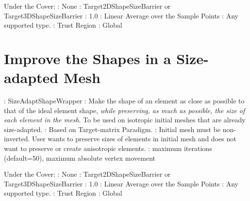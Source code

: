 \noindent Under the Cover: \newline
{}: None \newline
{}:  Target2DShapeSizeBarrier or Target3DShapeSizeBarrier \newline
{}: 1.0 \newline
{}: Linear Average over the Sample Points \newline
{}: Any supported type.  \newline
{}: Trust Region \newline
{}: Global \newline

 
\section{Improve the Shapes in a Size-adapted Mesh} \label{sec:SizeAdaptShapeWrapper}

: SizeAdaptShapeWrapper \newline
{}: Make the shape of an element as close as possible to that
of the ideal element shape, {\it while preserving, as much as possible, the size of each element in the mesh}. To be used on isotropic initial meshes that are already size-adapted. \newline
{}: Based on Target-matrix Paradigm. \newline
{}: Initial mesh must be non-inverted. 
User wants to preserve sizes of elements in initial mesh and does not want to preserve or 
create anisotropic elements.  \newline 
{}: maximum iterations (default=50), maximum absolute vertex movement \newline \newline

\noindent Under the Cover: \newline
{}: None \newline
{}: Target2DShapeSizeBarrier or Target3DShapeSizeBarrier \newline
{}: 1.0 \newline
{}: Linear Average over the Sample Points \newline
{}: Any supported type. \newline
{}: Trust Region \newline
{}: Global \newline


